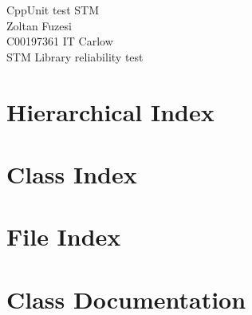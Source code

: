 \documentclass[twoside]{article}
\newcommand{\+}{\discretionary{\mbox{\scriptsize$\hookleftarrow$}}{}{}}
\begin{document}
\hypersetup{pageanchor=false,
             bookmarksnumbered=true,
             pdfencoding=unicode
            }
\begin{titlepage}
\vspace*{7cm}
\begin{center}%
{\Large CppUnit test STM }\\
\vspace*{1cm}
{\large Zoltan Fuzesi}\\
\vspace*{0.5cm}
{\large C00197361 IT Carlow}\\
\vspace*{1cm}
{\large STM Library reliability test}\\
\end{center}
\end{titlepage}
\tableofcontents
{}
\hypersetup{pageanchor=true}

\section{Hierarchical Index}

\section{Class Index}

\section{File Index}

\section{Class Documentation}












\end{document}
